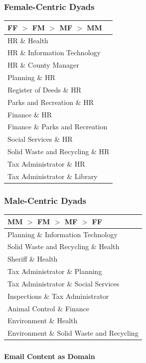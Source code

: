 \documentclass[xcolor={table}]{beamer}
\begin{document}
\begin{frame}\frametitle{Female-Centric Dyads}
	\centering
	\Large
	\begin{tabular}{l}
	  \toprule
	FF $>$ FM $>$ MF $>$ MM  \\
	\hline
	  HR \& Health  \\ 
	  HR \& Information Technology  \\ 
	  HR \& County Manager  \\ 
	  Planning \& HR \\ 
	  Register of Deeds \& HR  \\ 
	  Parks and Recreation \& HR  \\ 
	  Finance \& HR  \\ 
	  Finance \& Parks and Recreation  \\ 
	  Social Services \& HR  \\ 
	  Solid Waste and Recycling \& HR  \\ 
	  Tax Administrator \& HR  \\ 
	  Tax Administrator \& Library  \\ 
	   \bottomrule
	\end{tabular}
	
	
	
	
\end{frame}


\begin{frame}\frametitle{Male-Centric Dyads}
	\centering
	\Large
	\begin{tabular}{l}
	  \toprule
	  MM $>$ FM $>$ MF $>$ FF \\ 
	  \midrule
	  Planning \& Information Technology \\ 
	  Solid Waste and Recycling \& Health \\ 
	  Sheriff \& Health  \\ 
	  Tax Administrator \& Planning  \\ 
	  Tax Administrator \& Social Services  \\ 
	  Inspections \& Tax Administrator  \\ 
	  Animal Control \& Finance   \\ 
	  Environment \& Health  \\ 
	  Environment \& Solid Waste and Recycling  \\  
	   \bottomrule
	\end{tabular}
	
	
	
	
\end{frame}

\begin{frame}\frametitle{}
	\begin{center}
		\Huge\textbf{Email Content as Domain}
	\end{center}
\end{frame}
\end{document}
